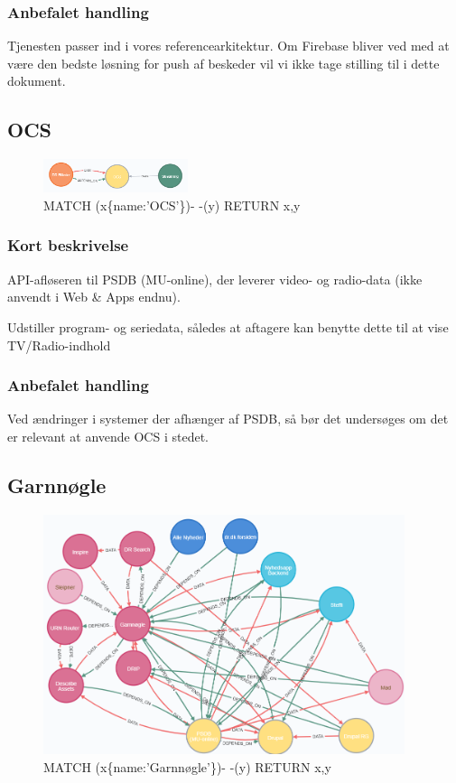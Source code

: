 \documentclass{article}
\begin{document}
\subsubsection{Anbefalet handling}
Tjenesten passer ind i vores referencearkitektur. Om Firebase bliver ved med at være den bedste løsning for push af beskeder vil vi ikke tage stilling til i dette dokument.


\subsection{OCS}
\begin{figure}[h]
\includegraphics[width=120pt]{OCS.PNG}
\caption{MATCH (x\{name:'OCS'\})- -(y) RETURN x,y}
\end{figure}
\subsubsection{Kort beskrivelse}
API-afløseren til PSDB (MU-online), der leverer video- og radio-data (ikke anvendt i Web \& Apps endnu).

Udstiller program- og seriedata, således at aftagere kan benytte dette til at vise TV/Radio-indhold
\subsubsection{Anbefalet handling}
Ved ændringer i systemer der afhænger af PSDB, så bør det undersøges om det er relevant at anvende OCS i stedet.



\subsection{Garnnøgle}
\begin{figure}[h]
\includegraphics[width=300pt]{Garnnoegle.PNG}
\caption{MATCH (x\{name:'Garnnøgle'\})- -(y) RETURN x,y}
\end{figure}
\end{document}
